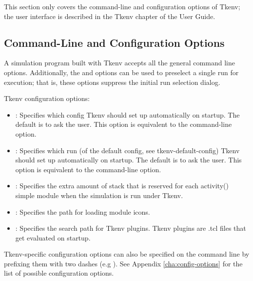 \begin{note}
  This section only covers the command-line and configuration options
  of Tkenv; the user interface is described in the Tkenv chapter of the
  {\opp} User Guide.
\end{note}

\subsection{Command-Line and Configuration Options}

A simulation program built with Tkenv accepts all the general command line
options.  Additionally, the 
and  options can be used to preselect a single run for execution;
that is, these options suppress the initial run selection dialog.

Tkenv configuration options:
\begin{itemize}
  \item{:
    Specifies which config Tkenv should set up automatically on startup. The
    default is to ask the user. This option is equivalent to the 
    command-line option.}

  \item{: Specifies which run (of the default
    config, see tkenv-default-config) Tkenv should set up automatically on startup.
    The default is to ask the user. This option is equivalent to the 
    command-line option.}

  \item{:
    Specifies the extra amount of stack that is reserved for each activity()
    simple module when the simulation is run under Tkenv.}

  \item{: Specifies the path for loading module icons.}

  \item{:
    Specifies the search path for Tkenv plugins. Tkenv plugins are .tcl files
    that get evaluated on startup.}
\end{itemize}

Tkenv-specific configuration options can also be specified on the command line
by prefixing them with two dashes (e.g ). See
Appendix \ref{cha:config-options} for the list of possible configuration options.


